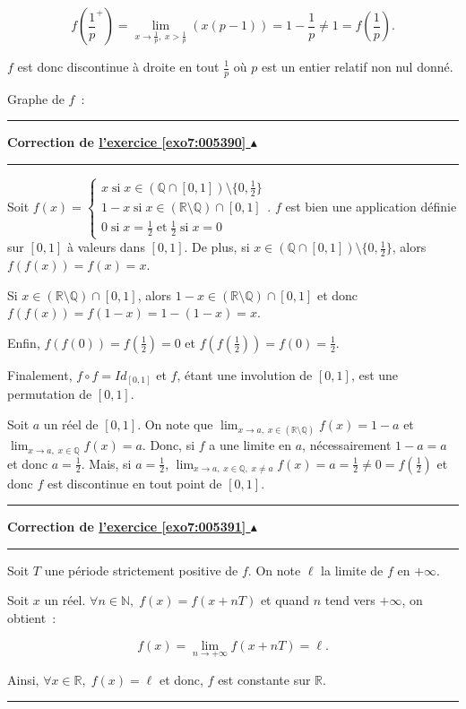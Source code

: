 \documentclass[11pt,a4paper]{article}
\newcommand{\Nn}{\mathbb{N}} \newcommand{\N}{\mathbb{N}}
\newcommand{\Qq}{\mathbb{Q}} \newcommand{\Q}{\mathbb{Q}}
\newcommand{\Rr}{\mathbb{R}} \newcommand{\R}{\mathbb{R}}
\newcounter{exo}
\newcommand{\correction}[1]{\hypertarget{cor7:#1}{}\label{cor7:#1}{\bf Correction de \hyperlink{exo7:#1}{l'exercice \ref{exo7:#1} $\blacktriangle$}}\vspace{1mm}\hrule\vspace{1mm}}
\newcommand{\fincorrection}{\vspace{1mm}\hrule\vspace*{7mm}}
\begin{document}
$$f(\frac{1}{p}^+)=\lim_{x \rightarrow\frac{1}{p},\;x>\frac{1}{p}}(x(p-1))=1-\frac{1}{p}\neq 1=f(\frac{1}{p}).$$

$f$ est donc discontinue à droite en tout $\frac{1}{p}$ où $p$ est un entier relatif non nul donné.

Graphe de $f$~:


\fincorrection
\correction{005390}
Soit $f(x)=\left\{
\begin{array}{l}
x\;\mbox{si}\;x\in(\Qq\cap[0,1])\setminus\{0,\frac{1}{2}\}\\
1-x\;\mbox{si}\;x\in(\Rr\setminus\Qq)\cap[0,1]\\
0\;\mbox{si}\;x=\frac{1}{2}\;\mbox{et}\;\frac{1}{2}\;\mbox{si}\;x=0
\end{array}
\right.$. $f$ est bien une application définie sur $[0,1]$ à valeurs dans $[0,1]$. De plus, si $x\in(\Qq\cap[0,1])\setminus\{0,\frac{1}{2}\}$, alors $f(f(x))=f(x)=x$.

Si $x\in(\Rr\setminus\Qq)\cap[0,1]$, alors $1-x\in(\Rr\setminus\Qq)\cap[0,1]$ et donc $f(f(x))=f(1-x)=1-(1-x)=x$.

Enfin, $f(f(0))=f(\frac{1}{2})=0$ et $f(f(\frac{1}{2}))=f(0)=\frac{1}{2}$.

Finalement, $f\circ f=Id_{[0,1]}$ et $f$, étant une involution de $[0,1]$, est une permutation de $[0,1]$.

Soit $a$ un réel de $[0,1]$. On note que $\lim_{x\rightarrow a,\;x\in(\Rr\setminus\Qq)}f(x)=1-a$ et $\lim_{x\rightarrow a,\;x\in\Qq}f(x)=a$. Donc, si $f$ a une limite en $a$, nécessairement $1-a=a$ et donc $a=\frac{1}{2}$. Mais, si $a=\frac{1}{2}$, $\lim_{x\rightarrow a,\;x\in\Qq,\;x\neq a}f(x)=a=\frac{1}{2}\neq0=f(\frac{1}{2})$ et donc $f$ est discontinue en tout point de $[0,1]$.
\fincorrection
\correction{005391}
Soit $T$  une période strictement positive de $f$. On note $\ell$ la limite de $f$ en $+\infty$.

Soit $x$ un réel. $\forall n\in\Nn,\;f(x)=f(x+nT)$ et quand $n$ tend vers $+\infty$, on obtient~:
 
$$f(x)=\lim_{n\rightarrow +\infty}f(x+nT)=\ell.$$ 

Ainsi, $\forall x\in\Rr,\;f(x)=\ell$ et donc, $f$ est constante sur $\Rr$.
\fincorrection
\end{document}

